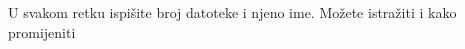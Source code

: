 \documentclass{exam}
\begin{document}
\begin{itemize}
                                                                                                                                                                                         U
                                                                                                                                                                                         svakom
                                                                                                                                                                                         retku
                                                                                                                                                                                         ispišite
                                                                                                                                                                                         broj
                                                                                                                                                                                         datoteke
                                                                                                                                                                                         i
                                                                                                                                                                                         njeno
                                                                                                                                                                                         ime.
                                                                                                                                                                                         Možete
                                                                                                                                                                                         istražiti
                                                                                                                                                                                         i
                                                                                                                                                                                         kako
                                                                                                                                                                                         promijeniti

\end{itemize}
\end{document}
